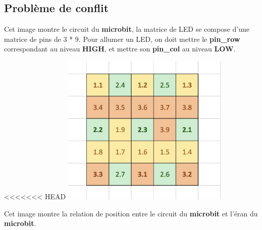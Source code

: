 \documentclass[14px]{article}
\begin{document}
\clearpage

\subsection{Problème de conflit}
\begin{figure}[htbp]
\end{figure}
Cet image montre le circuit du \textbf{microbit}, la matrice de LED se compose d'une matrice de pins de 3 * 9. Pour allumer un LED, on doit mettre le \textbf{pin\_row} correspondant au niveau \textbf{HIGH}, et mettre son \textbf{pin\_col} au niveau \textbf{LOW}.

<<<<<<< HEAD
\centering
\includegraphics[width=0.6\textwidth]{matrice_Pins.png}

Cet image montre la relation de position entre le circuit du  \textbf{microbit} et l'éran du \textbf{microbit}.\\

\clearpage
\end{document}
